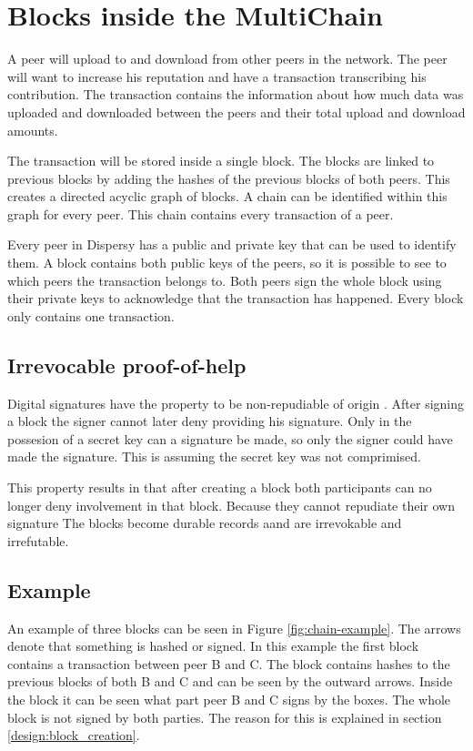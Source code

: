 \section{Blocks inside the MultiChain}
A peer will upload to and download from other peers in the network.
The peer will want to increase his reputation and have a transaction transcribing his contribution.
The transaction contains the information about how much data was uploaded and downloaded between the peers
and their total upload and download amounts.

The transaction will be stored inside a single block.
The blocks are linked to previous blocks by adding the hashes of the previous blocks of both peers.
This creates a directed acyclic graph of blocks.
A chain can be identified within this graph for every peer.
This chain contains every transaction of a peer.

Every peer in Dispersy has a public and private key that can be used to identify them.
A block contains both public keys of the peers,
so it is possible to see to which peers the transaction belongs to.
Both peers sign the whole block using their private keys to acknowledge that the transaction has happened.
Every block only contains one transaction.

\subsection{Irrevocable proof-of-help}
\label{sect:repudiation}
Digital signatures have the property to be non-repudiable of origin \cite{VanderLubbe-crypto}.
After signing a block the signer cannot later deny providing his signature.
Only in the possesion of a secret key can a signature be made,
so only the signer could have made the signature.
This is assuming the secret key was not comprimised.

This property results in that after creating a block
both participants can no longer deny involvement in that block.
Because they cannot repudiate their own signature
The blocks become durable records aand are irrevokable and irrefutable.

\subsection{Example}

An example of three blocks can be seen in Figure \ref{fig:chain-example}.
The arrows denote that something is hashed or signed.
In this example the first block contains a transaction between peer B and C.
The block contains hashes to the previous blocks of both B and C
and can be seen by the outward arrows.
Inside the block it can be seen what part peer B and C signs by the boxes.
The whole block is not signed by both parties.
The reason for this is explained in section \ref{design:block_creation}.

